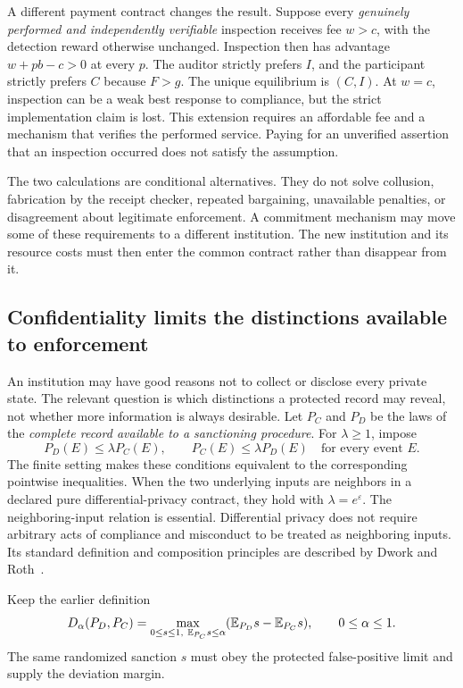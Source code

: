 A different payment contract changes the result. Suppose every \emph{genuinely performed and independently verifiable} inspection receives fee $w>c$, with the detection reward otherwise unchanged. Inspection then has advantage $w+pb-c>0$ at every $p$. The auditor strictly prefers $I$, and the participant strictly prefers $C$ because $F>g$. The unique equilibrium is $(C,I)$. At $w=c$, inspection can be a weak best response to compliance, but the strict implementation claim is lost. This extension requires an affordable fee and a mechanism that verifies the performed service. Paying for an unverified assertion that an inspection occurred does not satisfy the assumption.

The two calculations are conditional alternatives. They do not solve collusion, fabrication by the receipt checker, repeated bargaining, unavailable penalties, or disagreement about legitimate enforcement. A commitment mechanism may move some of these requirements to a different institution. The new institution and its resource costs must then enter the common contract rather than disappear from it.

\subsection{Confidentiality limits the distinctions available to enforcement}\label{MS:sec:privacy-enforcement}

An institution may have good reasons not to collect or disclose every private state. The relevant question is which distinctions a protected record may reveal, not whether more information is always desirable. Let $P_C$ and $P_D$ be the laws of the \emph{complete record available to a sanctioning procedure}. For $\lambda\ge1$, impose
\begin{equation}\label{MS:eq:pairwise-privacy}
 P_D(E)\le\lambda P_C(E),\qquad P_C(E)\le\lambda P_D(E)
 \quad\text{for every event }E.
\end{equation}
The finite setting makes these conditions equivalent to the corresponding pointwise inequalities. When the two underlying inputs are neighbors in a declared pure differential-privacy contract, they hold with $\lambda=e^\varepsilon$. The neighboring-input relation is essential. Differential privacy does not require arbitrary acts of compliance and misconduct to be treated as neighboring inputs. Its standard definition and composition principles are described by Dwork and Roth~\cite{MS:dworkroth}.

Keep the earlier definition
\[
D_\alpha(P_D,P_C)=\max_{0\le s\le1,\ \MSE_{P_C}s\le\alpha}
       (\MSE_{P_D}s-\MSE_{P_C}s),\qquad 0\le\alpha\le1.
\]
The same randomized sanction $s$ must obey the protected false-positive limit and supply the deviation margin.


